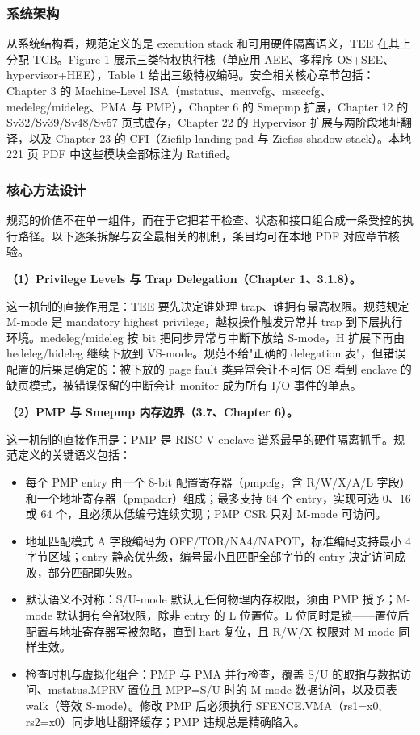 \documentclass[11pt]{ctexart}
\begin{document}
\subsubsection{系统架构}
从系统结构看，规范定义的是 execution stack 和可用硬件隔离语义，TEE 在其上分配 TCB。Figure 1 展示三类特权执行栈（单应用 AEE、多程序 OS+SEE、hypervisor+HEE），Table 1 给出三级特权编码。安全相关核心章节包括：Chapter 3 的 Machine-Level ISA（mstatus、menvcfg、mseccfg、medeleg/mideleg、PMA 与 PMP），Chapter 6 的 Smepmp 扩展，Chapter 12 的 Sv32/Sv39/Sv48/Sv57 页式虚存，Chapter 22 的 Hypervisor 扩展与两阶段地址翻译，以及 Chapter 23 的 CFI（Zicfilp landing pad 与 Zicfiss shadow stack）。本地 221 页 PDF 中这些模块全部标注为 Ratified。\par
\subsubsection{核心方法设计}
规范的价值不在单一组件，而在于它把若干检查、状态和接口组合成一条受控的执行路径。以下逐条拆解与安全最相关的机制，条目均可在本地 PDF 对应章节核验。\par
\noindent\textbf{（1）Privilege Levels 与 Trap Delegation（Chapter 1、3.1.8）。}\par
这一机制的直接作用是：TEE 要先决定谁处理 trap、谁拥有最高权限。规范规定 M-mode 是 mandatory highest privilege，越权操作触发异常并 trap 到下层执行环境。medeleg/mideleg 按 bit 把同步异常与中断下放给 S-mode，H 扩展下再由 hedeleg/hideleg 继续下放到 VS-mode。规范不给"正确的 delegation 表"，但错误配置的后果是确定的：被下放的 page fault 类异常会让不可信 OS 看到 enclave 的缺页模式，被错误保留的中断会让 monitor 成为所有 I/O 事件的单点。\par
\noindent\textbf{（2）PMP 与 Smepmp 内存边界（3.7、Chapter 6）。}\par
这一机制的直接作用是：PMP 是 RISC-V enclave 谱系最早的硬件隔离抓手。规范定义的关键语义包括：\par
\begin{itemize}
\item 每个 PMP entry 由一个 8-bit 配置寄存器（pmpcfg，含 R/W/X/A/L 字段）和一个地址寄存器（pmpaddr）组成；最多支持 64 个 entry，实现可选 0、16 或 64 个，且必须从低编号连续实现；PMP CSR 只对 M-mode 可访问。
\item 地址匹配模式 A 字段编码为 OFF/TOR/NA4/NAPOT，标准编码支持最小 4 字节区域；entry 静态优先级，编号最小且匹配全部字节的 entry 决定访问成败，部分匹配即失败。
\item 默认语义不对称：S/U-mode 默认无任何物理内存权限，须由 PMP 授予；M-mode 默认拥有全部权限，除非 entry 的 L 位置位。L 位同时是锁——置位后配置与地址寄存器写被忽略，直到 hart 复位，且 R/W/X 权限对 M-mode 同样生效。
\item 检查时机与虚拟化组合：PMP 与 PMA 并行检查，覆盖 S/U 的取指与数据访问、mstatus.MPRV 置位且 MPP=S/U 时的 M-mode 数据访问，以及页表 walk（等效 S-mode）。修改 PMP 后必须执行 SFENCE.VMA（rs1=x0, rs2=x0）同步地址翻译缓存；PMP 违规总是精确陷入。
\end{itemize}
\end{document}
